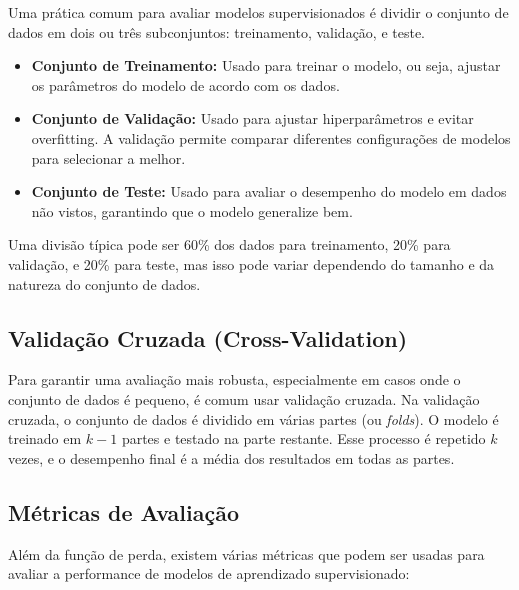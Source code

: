 \documentclass{article}
\begin{document}
Uma prática comum para avaliar modelos supervisionados é dividir o conjunto de dados em dois ou três subconjuntos: treinamento, validação, e teste.

\begin{itemize}
    \item \textbf{Conjunto de Treinamento:} Usado para treinar o modelo, ou seja, ajustar os parâmetros do modelo de acordo com os dados.
    \item \textbf{Conjunto de Validação:} Usado para ajustar hiperparâmetros e evitar overfitting. A validação permite comparar diferentes configurações de modelos para selecionar a melhor.
    \item \textbf{Conjunto de Teste:} Usado para avaliar o desempenho do modelo em dados não vistos, garantindo que o modelo generalize bem.
\end{itemize}

Uma divisão típica pode ser 60\% dos dados para treinamento, 20\% para validação, e 20\% para teste, mas isso pode variar dependendo do tamanho e da natureza do conjunto de dados.

\subsection{Validação Cruzada (Cross-Validation)}

Para garantir uma avaliação mais robusta, especialmente em casos onde o conjunto de dados é pequeno, é comum usar validação cruzada. Na validação cruzada, o conjunto de dados é dividido em várias partes (ou \textit{folds}). O modelo é treinado em \(k-1\) partes e testado na parte restante. Esse processo é repetido \(k\) vezes, e o desempenho final é a média dos resultados em todas as partes.

\subsection{Métricas de Avaliação}

Além da função de perda, existem várias métricas que podem ser usadas para avaliar a performance de modelos de aprendizado supervisionado:
\end{document}

